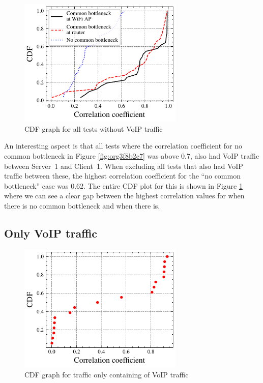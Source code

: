 \documentclass[a4paper,11pt]{article}
\begin{document}
\begin{figure}[htbp]
\centering
\includegraphics[width=0.7\textwidth]{figures/results/all-over2-no-video.pdf}
\caption{\label{fig:org6dcab10}CDF graph for all tests without VoIP traffic}
\end{figure}

An interesting aspect is that all tests where the correlation coefficient for no common bottleneck in Figure \ref{fig:org3f8b2c7} was above 0.7, also had VoIP traffic between Server~1 and Client~1. When excluding all tests that also had VoIP traffic between these, the highest correlation coefficient for the ``no common bottleneck'' case was 0.62. The entire CDF plot for this is shown in Figure \ref{fig:org6dcab10} where we can see a clear gap between the highest correlation values for when there is no common bottleneck and when there is.
\subsection{Only VoIP traffic}
\label{sec:org9ff6f2a}
\begin{figure}[htbp]
\centering
\includegraphics[width=0.7\textwidth]{figures/results/only-video-combined.pdf}
\caption{\label{fig:org3e56fc8}CDF graph for traffic only containing of VoIP traffic}
\end{figure}
\end{document}

